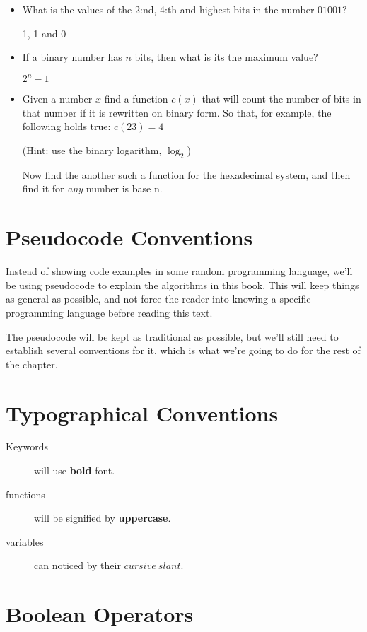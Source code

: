 \begin{itemize}

\item What is the values of the 2:nd, 4:th and highest bits in the
  number $01001$?

  1, 1 and 0

\item If a binary number has $n$ bits, then what is its the maximum value?

   $2^n - 1$

\item Given a number $x$ find a function $c(x)$ that will count the
  number of bits in that number if it is rewritten on binary form. So
  that, for example, the following holds true: $c(23) = 4$

  (Hint: use the binary logarithm, $\log_2$)

  Now find the another such a function for the hexadecimal system, and
  then find it for \textit{any} number is base n.

\end{itemize}

\section{Pseudocode Conventions}

Instead of showing code examples in some random programming language,
we'll be using pseudocode to explain the algorithms in this book. This
will keep things as general as possible, and not force the reader into
knowing a specific programming language before reading this text.

The pseudocode will be kept as traditional as possible, but we'll
still need to establish several conventions for it, which is what
we're going to do for the rest of the chapter.

\section{Typographical Conventions}

\begin{description}
\item[Keywords] will use \textbf{bold} font.
\item[functions] will be signified by \textbf{uppercase}.
\item[variables] can noticed by their $cursive\ slant$.
\end{description}

\section{Boolean Operators}
\label{sec:boolean-operators}

